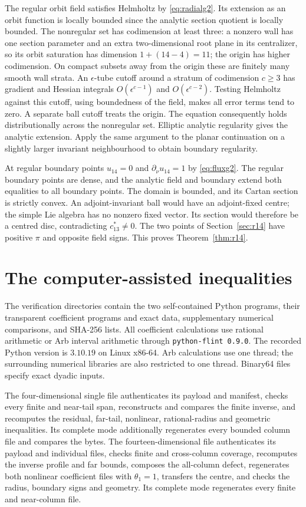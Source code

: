 \documentclass[11pt]{amsart}
\theoremstyle{remark}
\numberwithin{equation}{section}
\begin{document}
The regular orbit field satisfies Helmholtz by
\eqref{eq:radialg2}. Its extension as an orbit function is locally
bounded since the analytic section quotient is locally bounded.
The nonregular set has codimension at least three: a nonzero wall
has one section parameter and an extra two-dimensional root plane
in its centralizer, so its orbit saturation has dimension
$1+(14-4)=11$; the origin has higher codimension. On compact subsets
away from the origin these are finitely many smooth wall strata.
An $\epsilon$-tube cutoff around a stratum of codimension $c\ge3$
has gradient and Hessian integrals
$O(\epsilon^{c-1})$ and $O(\epsilon^{c-2})$. Testing Helmholtz
against this cutoff, using boundedness of the field, makes all error
terms tend to zero. A separate ball cutoff treats the origin.
The equation consequently holds distributionally across the
nonregular set. Elliptic analytic regularity gives the analytic
extension. Apply the same argument to the planar continuation on
a slightly larger invariant neighbourhood to obtain boundary
regularity.

At regular boundary points $u_{14}=0$ and
$\partial_\nu u_{14}=1$ by \eqref{eq:fluxg2}. The regular boundary
points are dense, and the analytic field and boundary extend both
equalities to all boundary points. The domain is bounded, and its
Cartan section is strictly convex.
An adjoint-invariant ball would have an adjoint-fixed centre; the
simple Lie algebra has no nonzero fixed vector. Its section would
therefore be a centred disc, contradicting $c_{13}^*\ne0$.
The two points of Section~\ref{sec:r14} have positive $\pi$ and
opposite field signs. This proves Theorem~\ref{thm:r14}.

\section{The computer-assisted inequalities}\label{sec:computer}
The verification directories contain the two self-contained Python
programs, their transparent coefficient programs and exact data,
supplementary numerical comparisons, and SHA-256 lists. All
coefficient calculations use rational arithmetic or Arb interval
arithmetic through \texttt{python-flint 0.9.0}. The recorded Python
version is $3.10.19$ on Linux x86-64. Arb calculations use one thread;
the surrounding numerical libraries are also restricted to one
thread. Binary64 files specify exact dyadic inputs.

The four-dimensional single file authenticates its payload and
manifest, checks every finite and near-tail span, reconstructs and
compares the finite inverse, and recomputes the residual, far-tail,
nonlinear, rational-radius and geometric inequalities. Its complete
mode additionally regenerates every bounded column file and compares
the bytes. The fourteen-dimensional file authenticates its payload
and individual files, checks finite and cross-column coverage,
recomputes the inverse profile and far bounds, composes the
all-column defect, regenerates both nonlinear coefficient files
with $\theta_1=1$, transfers the centre, and checks the radius,
boundary signs and geometry. Its complete mode regenerates every
finite and near-column file.
\end{document}
